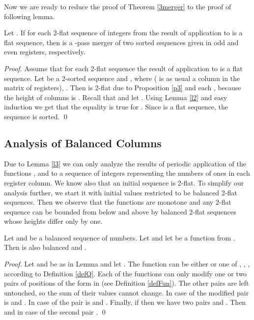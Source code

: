 \documentclass{llncs}
\begin{document}
Now we are ready to reduce the proof of Theorem \ref{3merger} to the
proof of following lemma.
\begin{lemma} \label{l3}
Let . If for each 2-flat sequence  of integers from  the result of
application  to  is a
flat sequence, then  is a -pass merger of two sorted sequences
given in odd and even registers, respectively.
\end{lemma}
\begin{proof}
Assume that for each 2-flat sequence  the result of application  to  is a flat sequence.  Let
 be a 2-sorted sequence and , where  ( is
as usual a column in the matrix of registers), . Then
 is 2-flat due to Proposition \ref{p3} and each 
, because the height of columns is . Recall 
that  and let
. Using Lemma \ref{l2} and easy
induction we get that the equality  is true for
. Since  is a flat sequence, the sequence
 is sorted. \qed
\end{proof}

\subsection{Analysis of Balanced Columns}

Due to Lemma \ref{l3} we can only analyze the results of periodic
application of the functions ,  and  to a sequence
of integers representing the numbers of ones in each register column. We
know also that an initial sequence is 2-flat. To simplify our analysis
further, we start it with initial values restricted to be balanced
2-flat sequences. Then we observe that the functions are monotone and
any 2-flat sequence can be bounded from below and above by balanced
2-flat sequences whose heights differ only by one.

\begin{lemma} \label{l4}
Let  and  be a balanced
sequence of numbers. Let  and let  be a
function from . Then  is
also balanced and .
\end{lemma}

\begin{proof}
Let  and  be as in Lemma and let .  The function 
can be either  or one of , , ,
according to Definition \ref{defQ}. Each of the functions can only
modify one or two pairs of positions of the form  in
 (see Definition \ref{defFun}). The other pairs are left
untouched, so the sum of their values cannot change. In case of 
the modified pair is  and . In case of  the pair is 
and .  Finally, if  then we have
two pairs  and . Then  and in case of the second pair
. \qed
\end{proof}
\end{document}
